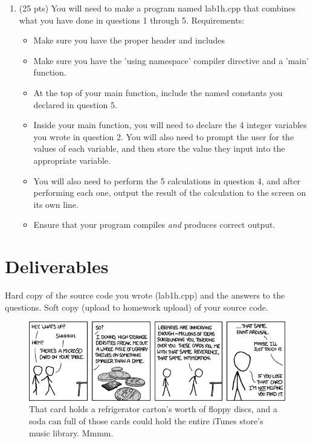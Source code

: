 \documentclass[letterpaper,12pt]{article}
\begin{document}
\begin{enumerate}
    \item (25 pts) You will need to make a program named lab1h.cpp that combines what you have done
          in questions 1 through 5. Requirements:
            \begin{itemize}
                \item Make sure you have the proper header and includes
                \item Make sure you have the 'using namespace' compiler directive and a 'main' function.
                \item At the top of your main function, include the named constants you declared in question 5.
                \item Inside your main function, you will need to declare the 4 integer variables
                      you wrote in question 2. You will also need to prompt the user for the values of
                      each variable, and then store the value they input into the appropriate variable.
                \item You will also need to perform the 5 calculations in question 4, and after performing
                      each one, output the result of the calculation to the screen on its own line.
                \item Ensure that your program compiles \emph{and} produces correct output.
            \end{itemize}
\end{enumerate}
\section*{Deliverables}
Hard copy of the source code you wrote (lab1h.cpp) and the answers to the questions.
Soft copy (upload to homework upload) of your source code.

\begin{figure}[ht!]
	\centering
	\includegraphics[width=5in]{microsd.png}
\caption*{That card holds a refrigerator carton's worth of floppy discs, and a soda can full
          of those cards could hold the entire iTunes store's music library. Mmmm.}
\end{figure}
\end{document}
